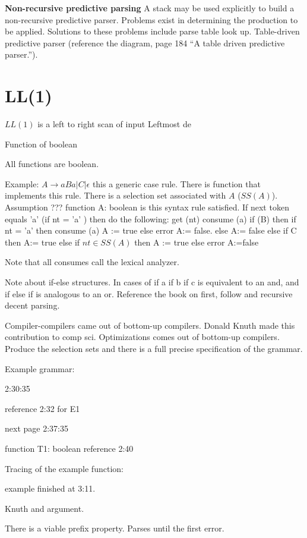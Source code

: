 \documentclass[11pt]{article}
\begin{document}
\textbf{Non-recursive predictive parsing}
A stack may be used explicitly to build a non-recursive predictive parser.  Problems exist in determining the production to be applied.  Solutions to these problems include parse table look up.   Table-driven predictive parser (reference the diagram, page 184 ``A table driven predictive parser.'').




\section {LL(1)}
$LL(1)$ is a left to right scan of input Leftmost de

Function of boolean 

All functions are boolean.  

Example: $A\to aBa |C |\epsilon$ this a generic case rule.  There is function that implements this rule.  There is a selection set associated with $A$ ($SS(A)$).  Assumption ??? 
function A: boolean 
is this syntax rule satisfied.  
If next token equals 'a'  (if nt = 'a' ) then do the following:
	get (nt)
	consume (a)
	if (B) then if nt = 'a' then consume (a) A := true
		else 
		error A:= false.
	else
		A:= false 
else 
	if C then A:= true
else 
	if $nt \in SS(A)$ then A := true
	else 
		error
		A:=false
		
Note that all consumes call the lexical analyzer.  

Note about if-else structures.  In cases of if a if b if c is equivalent to an and, and if else if is analogous to an or.   Reference the book on first, follow and recursive decent parsing.  

Compiler-compilers came out of bottom-up compilers.  Donald Knuth made this contribution to comp sci.  Optimizations comes out of bottom-up compilers.  Produce the selection sets and there is a full precise specification of the grammar.  


Example grammar:

2:30:35

reference 2:32 for E1  

next page 2:37:35

function T1: boolean reference 2:40 

Tracing of the example function:

example finished at 3:11.  

Knuth and   argument.  

There is a viable prefix property.  Parses until the first error.  
\end{document}

